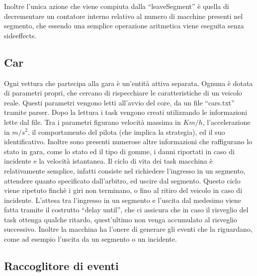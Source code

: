 Inoltre l’unica azione che viene compiuta dalla “leaveSegment” è quella di decrementare un contatore interno relativo al numero di macchine presenti nel segmento, che essendo una semplice operazione aritmetica viene eseguita senza sideeffects.


\subsection{Car}

Ogni vettura che partecipa alla gara è un’entità attiva separata. Ognuna è dotata di parametri propri, che cercano di rispecchiare le caratteristiche di un veicolo reale. Questi parametri vengono letti all’avvio del core, da un file “cars.txt” tramite parser. Dopo la lettura i task vengono creati utilizzando le informazioni lette dal file. Tra i parametri figurano velocità massima in $Km/h$, l’accelerazione in $m/s^2$, il comportamento del pilota (che implica la strategia), ed il suo identificativo. Inoltre sono presenti numerose altre informazioni che raffigurano lo stato in gara, come lo stato ed il tipo di gomme, i danni riportati in caso di incidente e la velocità istantanea.
Il ciclo di vita dei task macchina è relativamente semplice, infatti consiste nel richiedere l’ingresso in un segmento, attendere quanto specificato dall’arbitro, ed uscire dal segmento.
Questo ciclo viene ripetuto finchè i giri non terminano, o fino al ritiro del veicolo in caso di incidente.
L’attesa tra l’ingresso in un segmento e l’uscita dal medesimo viene fatta tramite il costrutto “delay until”, che ci assicura che in caso il risveglio del task ottenga qualche ritardo, quest’ultimo non venga accumulato al risveglio successivo.
Inoltre la macchina ha l’onere di generare gli eventi che la riguardano, come ad esempio l’uscita da un segmento o un incidente.

\subsection{Raccoglitore di eventi}

